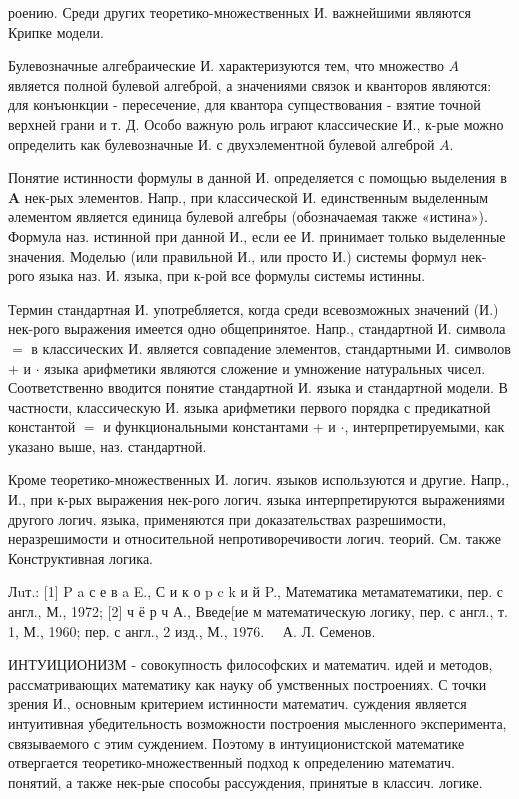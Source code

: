 \documentclass[10pt]{article}
\begin{document}
роению. Среди других теоретико-множественных И. важнейшими являются Крипке модели.



Булевозначные алгебраические И. характеризуются тем, что множество $A$ является полной булевой алгеброй, а значениями связок и кванторов являются: для конъюнкции - пересечение, для квантора супцествования - взятие точной верхней грани и т. Д. Особо важную роль играют классические И., к-рые можно определить как булевозначные И. с двухэлементной булевой алгеброй $A$.



Понятие истинности формулы в данной И. определяется с помощью выделения в $\boldsymbol{A}$ нек-рых элементов. Напр., при классической И. единственным выделенным әлементом является единица булевой алгебры (обозначаемая также «истина»). Формула наз. истинной при данной И., если ее И. принимает только выделенные значения. Моделью (или правильной И., или просто И.) системы формул нек-рого языка наз. И. языка, при к-рой все формулы системы истинны.



Термин стандартная И. употребляется, когда среди всевозможных значений (И.) нек-рого выражения имеется одно общепринятое. Напр., стандартной И. символа $=$ в классических И. является совпадение элементов, стандартными И. символов + и $\cdot$ языка арифметики являются сложение и умножение натуральных чисел. Соответственно вводится понятие стандартной И. языка и стандартной модели. В частности, классическую И. языка арифметики первого порядка с предикатной константой $=$ и функциональными константами + и $\cdot$, интерпретируемыми, как указано выше, наз. стандартной.



Кроме теоретико-множественных И. логич. языков используются и другие. Напр., И., при к-рых выражения нек-рого логич. языка интерпретируются выражениями другого логич. языка, применяются при доказательствах разрешимости, неразрешимости и относительной непротиворечивости логич. теорий. См. также Конструктивная логика.



Лuт.: [1] P a с е в a E., С и к о p c k и й P., Математика метаматематики, пер. с англ., М., 1972; [2] ч ё р ч А., Введе[ие м математическую логику, пер. с англ., т. 1, М., 1960; пер. с англ., 2 изд., М., $1976 . \quad$ А. Л. Семенов.



ИНТУИЦИОНИЗМ - совокупность философских и математич. идей и методов, рассматривающих математику как науку об умственных построениях. С точки зрения И., основным критерием истинности математич. суждения является интуитивная убедительность возможности построения мысленного эксперимента, связываемого с этим суждением. Поэтому в интуиционистской математике отвергается теоретико-множественный подход к определению математич. понятий, а также нек-рые способы рассуждения, принятые в классич. логике.
\end{document}
